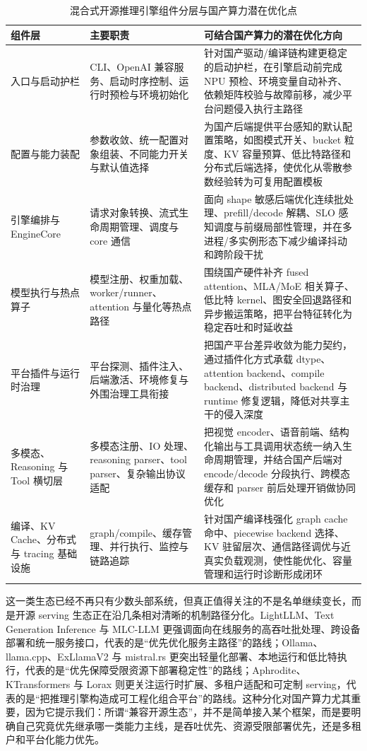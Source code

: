\begin{table}[t]
\centering
\footnotesize
\setlength{\tabcolsep}{4pt}
\caption{混合式开源推理引擎组件分层与国产算力潜在优化点}
\label{tab:hybrid-components}
\begin{tabularx}{\textwidth}{>{\raggedright\arraybackslash}p{2.3cm}p{4.0cm}X}
\toprule
组件层 & 主要职责 & 可结合国产算力的潜在优化方向 \\
\midrule
入口与启动护栏 & CLI、OpenAI 兼容服务、启动时序控制、运行时预检与环境初始化 & 针对国产驱动/编译链构建更稳定的启动护栏，在引擎启动前完成 NPU 预检、环境变量自动补齐、依赖矩阵校验与故障前移，减少平台问题侵入执行主路径 \\
配置与能力装配 & 参数收敛、统一配置对象组装、不同能力开关与默认值选择 & 为国产后端提供平台感知的默认配置策略，如图模式开关、bucket 粒度、KV 容量预算、低比特路径和分布式后端选择，使优化从零散参数经验转为可复用配置模板 \\
引擎编排与 EngineCore & 请求对象转换、流式生命周期管理、调度与 core 通信 & 面向 shape 敏感后端优化连续批处理、prefill/decode 解耦、SLO 感知调度与前缀局部性管理，并在多进程/多实例形态下减少编译抖动和跨阶段干扰 \\
模型执行与热点算子 & 模型注册、权重加载、worker/runner、attention 与量化等热点路径 & 围绕国产硬件补齐 fused attention、MLA/MoE 相关算子、低比特 kernel、图安全回退路径和异步搬运策略，把平台特征转化为稳定吞吐和时延收益 \\
平台插件与运行时治理 & 平台探测、插件注入、后端激活、环境修复与外围治理工具衔接 & 把国产平台差异收敛为能力契约，通过插件化方式承载 dtype、attention backend、compile backend、distributed backend 与 runtime 修复逻辑，降低对共享主干的侵入深度 \\
多模态、Reasoning 与 Tool 横切层 & 多模态注册、IO 处理、reasoning parser、tool parser、复杂输出协议适配 & 把视觉 encoder、语音前端、结构化输出与工具调用状态统一纳入生命周期管理，并结合国产后端对 encode/decode 分段执行、跨模态缓存和 parser 前后处理开销做协同优化 \\
编译、KV Cache、分布式与 tracing 基础设施 & graph/compile、缓存管理、并行执行、监控与链路追踪 & 针对国产编译栈强化 graph cache 命中、piecewise backend 选择、KV 驻留层次、通信路径调优与近真实负载观测，使性能优化、容量管理和运行时诊断形成闭环 \\
\bottomrule
\end{tabularx}
\end{table}

这一类生态已经不再只有少数头部系统，但真正值得关注的不是名单继续变长，而是开源 serving 生态正在沿几条相对清晰的机制路径分化。LightLLM、Text Generation Inference 与 MLC-LLM 更强调面向在线服务的高吞吐批处理、跨设备部署和统一服务接口，代表的是“优先优化服务主路径”的路线；Ollama、llama.cpp、ExLlamaV2 与 mistral.rs 更突出轻量化部署、本地运行和低比特执行，代表的是“优先保障受限资源下部署稳定性”的路线；Aphrodite、KTransformers 与 Lorax 则更关注运行时扩展、多租户适配和可定制 serving，代表的是“把推理引擎构造成可工程化组合平台”的路线\citep{lightllm,tgi,mlcllm,ollama,llamacpp,exllamav2,mistralrs,aphrodite,ktransformers,lorax}。这种分化对国产算力尤其重要，因为它提示我们：所谓“兼容开源生态”，并不是简单接入某个框架，而是要明确自己究竟优先继承哪一类能力主线，是吞吐优先、资源受限部署优先，还是多租户和平台化能力优先。

